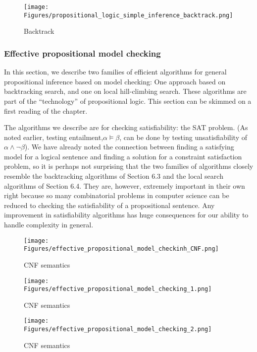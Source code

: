 \begin{figure}[H]
    \centering
    \texttt{[image: Figures/propositional\_logic\_simple\_inference\_backtrack.png]}
    \caption{Backtrack}
    \label{fig:SI backtrack}
\end{figure}


\subsubsection{Effective propositional model checking}


In this section, we describe two families of efficient algorithms for general propositional
inference based on model checking: One approach based on backtracking search, and one
on local hill-climbing search. These algorithms are part of the “technology” of propositional
logic. This section can be skimmed on a first reading of the chapter.


The algorithms we describe are for checking satisfiability: the SAT problem. (As noted
earlier, testing entailment,$\alpha \models \beta$, can be done by testing unsatisfiability of $\alpha \wedge \neg \beta$). We
have already noted the connection between finding a satisfying model for a logical sentence
and finding a solution for a constraint satisfaction problem, so it is perhaps not surprising that
the two families of algorithms closely resemble the backtracking algorithms of Section 6.3
and the local search algorithms of Section 6.4. They are, however, extremely important in
their own right because so many combinatorial problems in computer science can be reduced
to checking the satisfiability of a propositional sentence. Any improvement in satisfiability
algorithms has huge consequences for our ability to handle complexity in general.


\begin{figure}[H]
    \centering
    \texttt{[image: Figures/effective\_propositional\_model\_checkinh\_CNF.png]}
    \caption{CNF semantics}
    \label{fig:CNF}
\end{figure}



\begin{figure}[H]
    \centering
    \texttt{[image: Figures/effective\_propositional\_model\_checking\_1.png]}
    \caption{CNF semantics}
    \label{fig:CNF}
\end{figure}

\begin{figure}[H]
    \centering
    \texttt{[image: Figures/effective\_propositional\_model\_checking\_2.png]}
    \caption{CNF semantics}
    \label{fig:CNF}
\end{figure}

